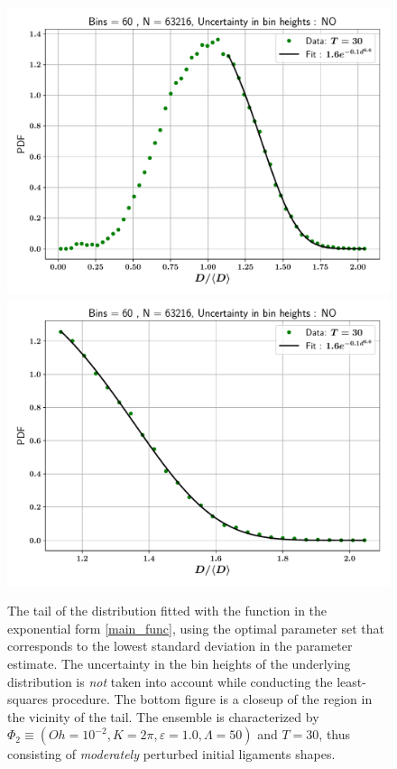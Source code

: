 
\begin{figure}
\centering
\includegraphics{plots/drop_stats/linear_tail_fit_uncertainty_no.pdf} \\
\includegraphics{plots/drop_stats/linear_zoom_tail_fit_uncertainty_no.pdf} \\ 
\caption{
	The tail of the distribution fitted with the function 
	in the exponential form \eqref{main_func}, using the optimal parameter
	set that corresponds to the lowest standard deviation in the parameter estimate.
	The uncertainty in the bin heights of the underlying distribution is \textit{not}
	taken into account while conducting the least-squares procedure. 
	The bottom figure is a closeup of the region in the vicinity of the tail.
	The ensemble is characterized by $\Phi_2 \equiv \left( Oh = 10^{-2}, K = 2\pi 
	, \varepsilon = 1.0 , \Lambda = 50 \right)$ and $T = 30$, 
	thus consisting of \textit{moderately} perturbed initial ligaments shapes. 
	}
\label{linear_fits_wo}
\end{figure}

